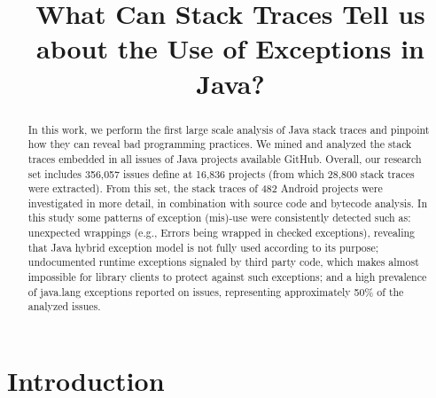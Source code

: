 \documentclass[conference]{IEEEtran}
\begin{document}
\title{What Can Stack Traces Tell us about the Use of Exceptions in Java?}

\author{
}

\newcommand{\todo}[1]{\textbf{TODO}\footnote{\textbf{TODO:} #1}}

\maketitle

\begin{abstract}

In this work, we perform the first large scale analysis of Java stack traces and
pinpoint how they can reveal bad programming practices. We mined and analyzed
the stack traces embedded in all issues of Java projects available GitHub.
Overall, our research set includes 356,057 issues define at 16,836 projects
(from which 28,800 stack traces were extracted). From this set, the stack traces
of 482 Android projects were investigated in more detail, in combination with
source code and bytecode analysis. In this study some patterns of exception
(mis)-use were consistently detected such as: unexpected wrappings (e.g., Errors
being wrapped in checked exceptions), revealing that Java hybrid exception
model is not fully used according to its purpose;  undocumented runtime
exceptions signaled by third party code, which makes almost impossible for
library clients to protect against such exceptions; and a high prevalence of
java.lang exceptions reported on issues, representing approximately 50\% of the
analyzed issues.


\end{abstract}


\section{Introduction}
\end{document}
